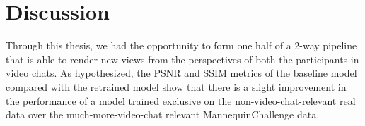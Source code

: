 \chapter{Discussion}\label{ch:discussion}





Through this thesis, we had the opportunity to form one half of a 2-way pipeline that is able to render new views from the perspectives of both the participants in video chats. As hypothesized, the PSNR and SSIM metrics of the baseline model compared with the retrained model show that there is a slight improvement in the performance of a model trained exclusive on the non-video-chat-relevant real data over the much-more-video-chat relevant MannequinChallenge data. 

